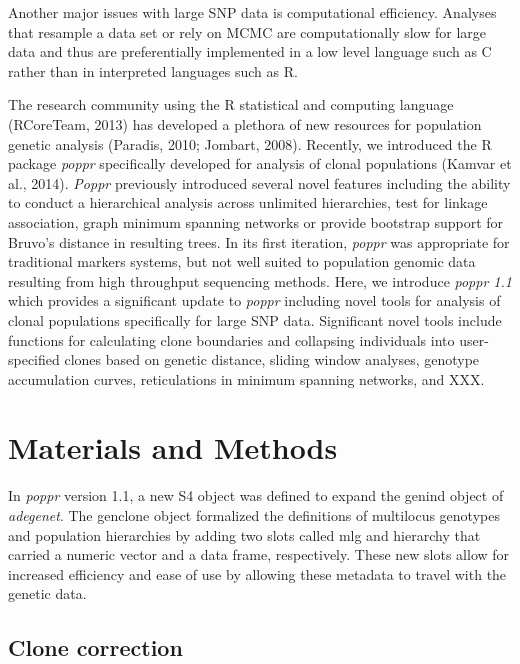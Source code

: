 \documentclass{frontiersSCNS} %
\begin{document}
Another major issues with large SNP data is computational efficiency.
Analyses that resample a data set or rely on MCMC are computationally
slow for large data and thus are preferentially implemented in a low
level language such as C rather than in interpreted languages such as R.

The research community using the R statistical and computing language
(RCoreTeam, 2013) has developed a plethora of new resources for
population genetic analysis (Paradis, 2010; Jombart, 2008). Recently, we
introduced the R package \emph{poppr} specifically developed for
analysis of clonal populations (Kamvar et al., 2014). \emph{Poppr}
previously introduced several novel features including the ability to
conduct a hierarchical analysis across unlimited hierarchies, test for
linkage association, graph minimum spanning networks or provide
bootstrap support for Bruvo's distance in resulting trees. In its first
iteration, \emph{poppr} was appropriate for traditional markers systems,
but not well suited to population genomic data resulting from high
throughput sequencing methods. Here, we introduce \emph{poppr 1.1} which
provides a significant update to \emph{poppr} including novel tools for
analysis of clonal populations specifically for large SNP data.
Significant novel tools include functions for calculating clone
boundaries and collapsing individuals into user-specified clones based
on genetic distance, sliding window analyses, genotype accumulation
curves, reticulations in minimum spanning networks, and XXX.

\section*{Materials and Methods}\label{materials-and-methods}

In \emph{poppr} version 1.1, a new S4 object was defined to expand the
genind object of \emph{adegenet}. The genclone object formalized the
definitions of multilocus genotypes and population hierarchies by adding
two slots called mlg and hierarchy that carried a numeric vector and a
data frame, respectively. These new slots allow for increased efficiency
and ease of use by allowing these metadata to travel with the genetic
data.

\subsection*{Clone correction}\label{clone-correction}
\end{document}
